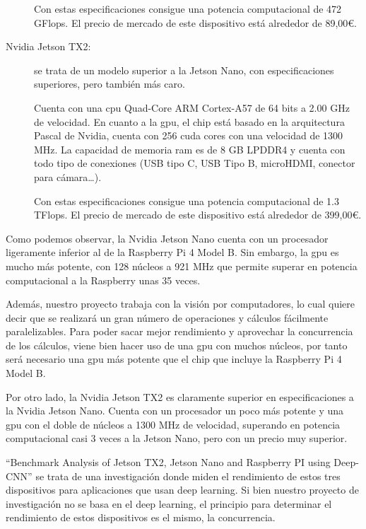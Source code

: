 \begin{description}
    Con estas especificaciones consigue una potencia computacional de 472 GFlops.
    El precio de mercado de este dispositivo está alrededor de 89,00€.

    \item[Nvidia Jetson TX2:]
    
    se trata de un modelo superior a la Jetson Nano, con especificaciones superiores, pero también más caro.

    Cuenta con una \gls{cpu} Quad-Core ARM Cortex-A57 de 64 bits a 2.00 GHz de velocidad.
    En cuanto a la \gls{gpu}, el chip está basado en la arquitectura Pascal de Nvidia, cuenta con 256 \gls{cuda} cores con una velocidad de 1300 MHz.
    La capacidad de memoria \gls{ram} es de 8 GB LPDDR4 y cuenta con todo tipo de conexiones (USB tipo C, USB Tipo B, microHDMI, conector para cámara\dots).

    Con estas especificaciones consigue una potencia computacional de 1.3 TFlops.
    El precio de mercado de este dispositivo está alrededor de 399,00€.
\end{description}

Como podemos observar, la Nvidia Jetson Nano cuenta con un procesador ligeramente inferior al de la Raspberry Pi 4 Model B.
Sin embargo, la \gls{gpu} es mucho más potente, con 128 núcleos a 921 MHz que permite superar en potencia computacional a la Raspberry unas 35 veces.

Además, nuestro proyecto trabaja con la visión por computadores, lo cual quiere decir que se realizará un gran número de operaciones y cálculos fácilmente paralelizables.
Para poder sacar mejor rendimiento y aprovechar la concurrencia de los cálculos, viene bien hacer uso de una \gls{gpu} con muchos núcleos, por tanto será necesario una \gls{gpu} más potente que el chip que incluye la Raspberry Pi 4 Model B.

Por otro lado, la Nvidia Jetson TX2 es claramente superior en especificaciones a la Nvidia Jetson Nano.
Cuenta con un procesador un poco más potente y una \gls{gpu} con el doble de núcleos a 1300 MHz de velocidad, superando en potencia computacional casi 3 veces a la Jetson Nano, pero con un precio muy superior.

``Benchmark Analysis of Jetson TX2, Jetson Nano and Raspberry PI using Deep-CNN''
\citep{Suzen2020} se trata de una investigación donde miden el rendimiento de estos tres dispositivos para aplicaciones que usan deep learning. Si bien nuestro proyecto de investigación no se basa en el deep learning, el principio para determinar el rendimiento de estos dispositivos es el mismo, la concurrencia.

